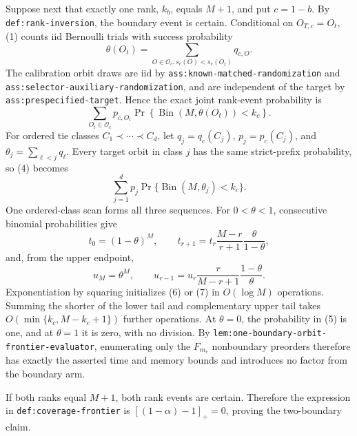 Suppose next that exactly one rank, \(k_b\), equals \(M+1\), and put \(c=1-b\). By \texttt{def:rank-inversion}, the boundary event is certain. Conditional on \(O_{T,c}=O_t\), (1) counts iid Bernoulli trials with success probability
\[
\theta(O_t)=\sum_{O\in\mathcal O_c:s_c(O)<s_c(O_t)}q_{c,O}.
\tag{3}
\]
The calibration orbit draws are iid by \texttt{ass:known-matched-randomization} and \texttt{ass:selector-auxiliary-randomization}, and are independent of the target by \texttt{ass:prespecified-target}. Hence the exact joint rank-event probability is
\[
\sum_{O_t\in\mathcal O_c}p_{c,O_t}\Pr\!\left\{\operatorname{Bin}(M,\theta(O_t))<k_c\right\}.
\tag{4}
\]
For ordered tie classes \(C_1\prec\cdots\prec C_d\), let \(q_j=q_c(C_j)\), \(p_j=p_c(C_j)\), and \(\theta_j=\sum_{\ell<j}q_\ell\). Every target orbit in class \(j\) has the same strict-prefix probability, so (4) becomes
\[
\sum_{j=1}^d p_j\Pr\{\operatorname{Bin}(M,\theta_j)<k_c\}.
\tag{5}
\]
One ordered-class scan forms all three sequences. For \(0<\theta<1\), consecutive binomial probabilities give
\[
t_0=(1-\theta)^M,\qquad t_{r+1}=t_r\frac{M-r}{r+1}\frac{\theta}{1-\theta},
\tag{6}
\]
and, from the upper endpoint,
\[
u_M=\theta^M,\qquad u_{r-1}=u_r\frac r{M-r+1}\frac{1-\theta}{\theta}.
\tag{7}
\]
Exponentiation by squaring initializes (6) or (7) in \(O(\log M)\) operations. Summing the shorter of the lower tail and complementary upper tail takes \(O(\min\{k_c,M-k_c+1\})\) further operations. At \(\theta=0\), the probability in (5) is one, and at \(\theta=1\) it is zero, with no division. By \texttt{lem:one-boundary-orbit-frontier-evaluator}, enumerating only the \(F_{m_c}\) nonboundary preorders therefore has exactly the asserted time and memory bounds and introduces no factor from the boundary arm.

If both ranks equal \(M+1\), both rank events are certain. Therefore the expression in \texttt{def:coverage-frontier} is \([(1-\alpha)-1]_+=0\), proving the two-boundary claim.

